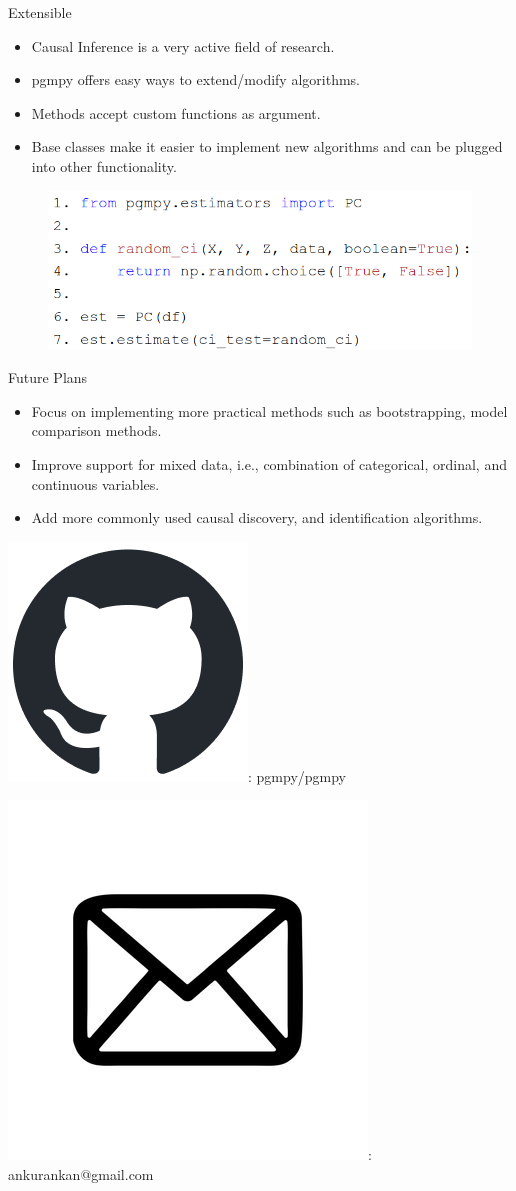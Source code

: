 \documentclass{beamer}
\newcommand\github{\includegraphics[height=2ex]{imgs/github.png}}
\newcommand\email{\includegraphics[height=3ex]{imgs/email.png}}
\begin{document}
\begin{frame}{Extensible}
	\begin{itemize}
		\item Causal Inference is a very active field of research.
		\item pgmpy offers easy ways to extend/modify algorithms.
		\item Methods accept custom functions as argument.
		\item Base classes make it easier to implement new algorithms and can be plugged into other functionality.
	\end{itemize}
	\vspace{1em}
	\begin{figure}
		\centering
		\includegraphics[scale=0.3]{imgs/extend.png}
	\end{figure}
\end{frame}

\begin{frame}{Future Plans}
	\begin{itemize}
		\item Focus on implementing more practical methods such as bootstrapping, model comparison methods.
		\item Improve support for mixed data, i.e., combination of categorical, ordinal, and continuous variables.
		\item Add more commonly used causal discovery, and identification algorithms.
	\end{itemize}
\end{frame}

\begin{frame}
	\vspace{5em}

	\github : pgmpy/pgmpy
	\vspace{1em}

	\email : ankurankan@gmail.com
\end{frame}

% 
\end{document}
